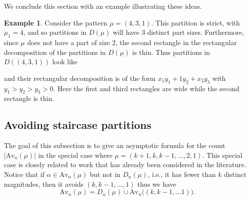 \documentclass{article}
\theoremstyle{plain}
\newtheorem{theorem}{Theorem}[section]
\theoremstyle{definition}
\newtheorem{example}[theorem]{Example}
\newcommand{\Av}{\text{Av}}
\begin{document}
We conclude this section with an example illustrating these ideas.  

\begin{example}
Consider the pattern $\mu = (4,3,1)$.  This partition is strict, with $\mu_1 = 4$, and so partitions in $D(\mu)$ will have 3 distinct part sizes.  Furthermore, since $\mu$ does not have a part of size 2, the second rectangle in the rectangular decomposition of the partitions in $D(\mu)$ is thin.  Thus partitions in  $D((4,3,1))$ look like
\begin{center}
\end{center}
and their rectangular decomposition is of the form $x_1y_1 + 1y_2 + x_3y_3$ with $y_1>y_2>y_3>0$.  Here the first and third rectangles are wide while the second rectangle is  thin.  
\end{example}













\subsection{Avoiding staircase partitions}\label{ssec:staircases}

The goal of this subsection is to give an asymptotic formula for the count $|\Av_n(\mu)|$ in the special case where  $\mu=(k+1,k,k-1,\ldots, 2,1)$.  This special case is closely related to work that has already been considered in the literature.  Notice that if $\alpha \in \Av_n(\mu)$ but not in $D_n(\mu)$, i.e., it has fewer than $k$ distinct magnitudes, then it avoids $(k,k-1,\ldots, 1)$ thus we have
\begin{equation}
    \Av_n(\mu) = D_n(\mu) \cup \Av_n\big((k,k-1,\ldots 1)\big). \label{eqn:stairdecomp}
\end{equation}
\end{document}
